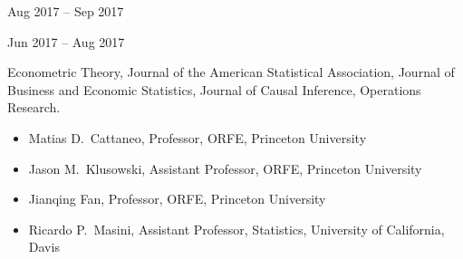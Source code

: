 \documentclass[
  date,
  number,
]{wgu-cv}
\begin{document}
{}
{Aug 2017 -- Sep 2017}
\vspace*{2mm}

{}
{Jun 2017 -- Aug 2017}


Econometric Theory,
Journal of the American Statistical Association,
Journal of Business and Economic Statistics,
Journal of Causal Inference,
Operations Research.


\vspace*{-2mm}

\begin{itemize}

  \item
    Matias D.\ Cattaneo,
    Professor,
    ORFE,
    Princeton University

  \item
    Jason M.\ Klusowski,
    Assistant Professor,
    ORFE,
    Princeton University

  \item
    Jianqing Fan,
    Professor,
    ORFE,
    Princeton University

  \item
    Ricardo P.\ Masini,
    Assistant Professor,
    Statistics,
    University of California, Davis

\end{itemize}

\end{document}
